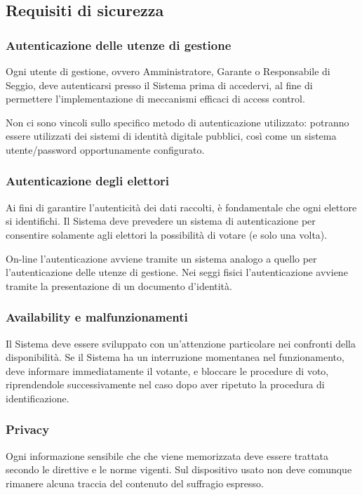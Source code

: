 \documentclass{report}
\begin{document}
\subsection{Requisiti di sicurezza}

\subsubsection{Autenticazione delle utenze di gestione}
Ogni utente di gestione, ovvero Amministratore, Garante o Responsabile di Seggio, deve autenticarsi presso il Sistema prima di accedervi, al fine di permettere l'implementazione di meccanismi efficaci di access control. 

Non ci sono vincoli sullo specifico metodo di autenticazione utilizzato: potranno essere utilizzati dei sistemi di identità digitale pubblici, così come un sistema utente/password opportunamente configurato.

\subsubsection{Autenticazione degli elettori}
Ai fini di garantire l'autenticità dei dati raccolti, è fondamentale che ogni elettore si identifichi. Il Sistema deve prevedere un sistema di autenticazione per consentire solamente agli elettori la possibilità di votare (e solo una volta).

On-line l'autenticazione avviene tramite un sistema analogo a quello per l'autenticazione delle utenze di gestione. Nei seggi fisici l'autenticazione avviene tramite la presentazione di un documento d'identità.

\subsubsection{Availability e malfunzionamenti}
Il Sistema deve essere sviluppato con un'attenzione particolare nei confronti della disponibilità. Se il Sistema ha un interruzione momentanea nel funzionamento, deve informare immediatamente il votante, e bloccare le procedure di voto, riprendendole successivamente nel caso dopo aver ripetuto la procedura di identificazione.

\subsubsection{Privacy}
Ogni informazione sensibile che che viene memorizzata deve essere trattata secondo le direttive e le norme vigenti. Sul dispositivo usato non deve comunque rimanere alcuna traccia del contenuto del suffragio espresso.
\end{document}
